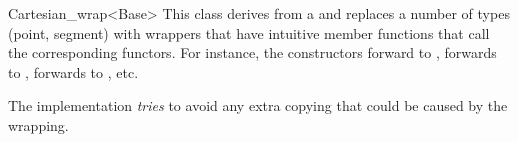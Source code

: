 \begin{ccRefClass}{Cartesian_wrap<Base>}
\ccDefinition
This class derives from a   and replaces a number
of types (point, segment) with wrappers that have intuitive member
functions that call the corresponding functors. For instance, the
constructors forward to ,
 forwards to
,
 forwards to
, etc.

\ccIsModel
{}

\ccImplementation
The implementation \emph{tries} to avoid any extra copying that could be
caused by the wrapping.

\end{ccRefClass}
